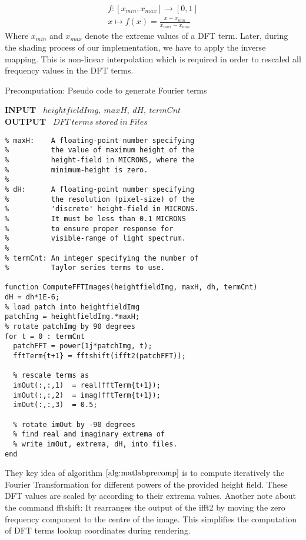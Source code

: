 \begin{align}
  f:\left[x_{min},x_{max}\right]\to \left[0,1\right] \nonumber\\
  x \mapsto f(x) = \frac{x-x_{min}}{x_{max}-x_{min}}
\label{eq:dfttermnormalization}
\end{align}
Where $x_{min}$ and $x_{max}$ denote the extreme values of a DFT term. Later, during the shading process of our implementation, we have to apply the inverse mapping. This is non-linear interpolation which is required in order to rescaled all frequency values in the DFT terms. 

\begin{algorithm}[H]
\caption{Precomputation: Pseudo code to generate Fourier terms}
\textbf{INPUT} \ $heightfieldImg, \ maxH, \ dH, \ termCnt$ \\
\textbf{OUTPUT} \ $DFT \ terms \ stored \ in \ Files$
\begin{lstlisting}
% maxH:    A floating-point number specifying 
%          the value of maximum height of the 
%          height-field in MICRONS, where the 
%          minimum-height is zero. 
%         
% dH:      A floating-point number specifying 
%          the resolution (pixel-size) of the 
%          'discrete' height-field in MICRONS. 
%          It must be less than 0.1 MICRONS 
%          to ensure proper response for 
%          visible-range of light spectrum.
%
% termCnt: An integer specifying the number of 
%          Taylor series terms to use.

function ComputeFFTImages(heightfieldImg, maxH, dh, termCnt)
dH = dh*1E-6;
% load patch into heightfieldImg
patchImg = heightfieldImg.*maxH;
% rotate patchImg by 90 degrees
for t = 0 : termCnt
  patchFFT = power(1j*patchImg, t);
  fftTerm{t+1} = fftshift(ifft2(patchFFT));
  
  % rescale terms as
  imOut(:,:,1)  = real(fftTerm{t+1});
  imOut(:,:,2)  = imag(fftTerm{t+1});
  imOut(:,:,3)  = 0.5;
  
  % rotate imOut by -90 degrees
  % find real and imaginary extrema of 
  % write imOut, extrema, dH, into files.
end
\end{lstlisting}
\label{alg:matlabprecomp}
\end{algorithm}

They key idea of algorithm $\ref{alg:matlabprecomp}$ is to compute iteratively the Fourier Transformation for different powers of the provided height field. These DFT values are scaled by according to their extrema values. Another note about the command fftshift: It rearranges the output of the ifft2 by moving the zero frequency component to the centre of the image. This simplifies the computation of DFT terms lookup coordinates during rendering.

